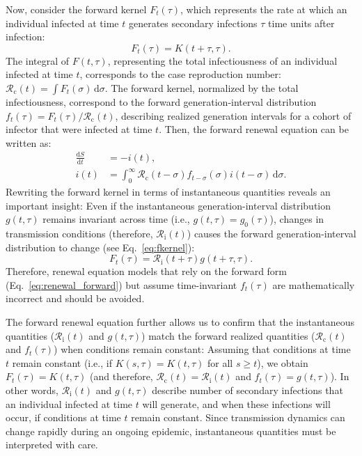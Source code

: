 \documentclass[12pt]{article}
\newcommand{\eref}[1]{Eq.~\ref{eq:#1}}
\newcommand{\Rx}[1]{\ensuremath{{\mathcal R}_{#1}}\xspace}
\newcommand{\Rc}{\Rx{\mathrm{c}}}
\newcommand{\Ri}{\Rx{\mathrm{i}}}
\newcommand{\dd}[1]{\ensuremath{\, \mathrm{d}#1}}
\newcommand{\dsigma}{\dd{\sigma}}
\begin{document}
Now, consider the forward kernel $F_t(\tau)$, which represents the rate at which an individual infected at time $t$ generates secondary infections $\tau$ time units after infection: 
\begin{equation}
F_t(\tau) = K(t+\tau, \tau).
\label{eq:fkernel}
\end{equation}
The integral of $F(t, \tau)$, representing the total infectiousness of an individual infected at time $t$, corresponds to the case reproduction number: $\Rc(t) = \int F_t(\sigma) \dsigma$. 
The forward kernel, normalized by the total infectiousness, correspond to the forward generation-interval distribution $f_t(\tau) = F_t(\tau)/\Rc(t)$, describing realized generation intervals for a cohort of infector that were infected at time $t$.
Then, the forward renewal equation can be written as:
\begin{align}
\frac{\mathrm{d}S}{\mathrm{d}t} &= - i(t),\\
i(t) &= \int_0^\infty \Rc(t-\sigma) f_{t-\sigma}(\sigma) i(t-\sigma) \dsigma.
\label{eq:renewal_forward}
\end{align}
Rewriting the forward kernel in terms of instantaneous quantities reveals an important insight: Even if the instantaneous generation-interval distribution $g(t, \tau)$ remains invariant across time (i.e., $g(t, \tau) = g_0(\tau)$), changes in transmission conditions (therefore, $\Ri(t)$) causes the forward generation-interval distribution to change (see \eref{fkernel}):
\begin{equation}
F_t(\tau) = \Ri(t + \tau) g(t+\tau, \tau).
\end{equation}
Therefore, renewal equation models that rely on the forward form (\eref{renewal_forward}) but assume time-invariant $f_t(\tau)$ are mathematically incorrect and should be avoided.

The forward renewal equation further allows us to confirm that the instantaneous quantities ($\Ri(t)$ and $g(t, \tau)$) match the forward realized quantities ($\Rc(t)$ and $f_t(\tau)$) when conditions remain constant:
Assuming that conditions at time $t$ remain constant (i.e., if $K(s, \tau) = K(t, \tau)$ for all $s \geq t$), we obtain $F_{t}(\tau) = K(t, \tau)$ (and therefore, $\Rc(t) = \Ri(t)$ and $f_{t}(\tau) = g(t,\tau)$).
In other words, $\Ri(t)$ and $g(t,\tau)$ describe number of secondary infections that an individual infected at time $t$ will generate, and when these infections will occur, if conditions at time $t$ remain constant.
Since transmission dynamics can change rapidly during an ongoing epidemic, instantaneous quantities must be interpreted with care.
\end{document}
